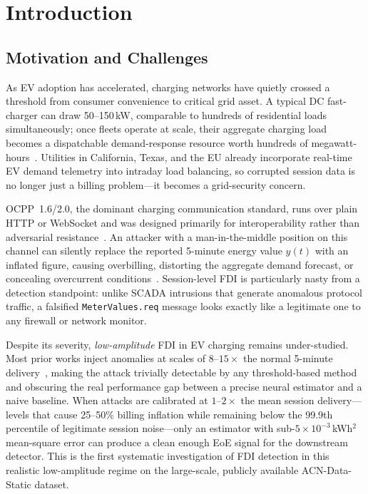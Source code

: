 \documentclass[journal]{IEEEtran}
\begin{document}

\section{Introduction}
\label{sec:intro}

\subsection{Motivation and Challenges}

As EV adoption has accelerated, charging networks have quietly
crossed a threshold from consumer convenience to critical grid
asset.
A typical DC fast-charger can draw 50--150\,kW, comparable to
hundreds of residential loads simultaneously; once fleets operate
at scale, their aggregate charging load becomes a dispatchable
demand-response resource worth hundreds of megawatt-hours~\cite{sun2020charging}.
Utilities in California, Texas, and the EU already incorporate
real-time EV demand telemetry into intraday load balancing,
so corrupted session data is no longer just a billing problem---it
becomes a grid-security concern.

OCPP~1.6/2.0, the dominant charging communication standard, runs
over plain HTTP or WebSocket and was designed primarily for
interoperability rather than adversarial resistance~\cite{sarieddine2023}.
An attacker with a man-in-the-middle position on this channel
can silently replace the reported 5-minute energy value $y(t)$
with an inflated figure, causing overbilling, distorting the
aggregate demand forecast, or concealing overcurrent
conditions~\cite{liu2011false}.
Session-level FDI is particularly nasty from a detection standpoint:
unlike SCADA intrusions that generate anomalous protocol traffic,
a falsified \texttt{MeterValues.req} message looks exactly like a
legitimate one to any firewall or network monitor.

Despite its severity, \emph{low-amplitude} FDI in EV charging
remains under-studied.
Most prior works inject anomalies at scales of $8$--$15\times$
the normal 5-minute delivery~\cite{basumatary2025,zhang2019false},
making the attack trivially detectable by any threshold-based
method and obscuring the real performance gap between a
precise neural estimator and a naive baseline.
When attacks are calibrated at $1$--$2\times$ the mean session
delivery---levels that cause 25--50\% billing inflation while
remaining below the 99.9th percentile of legitimate session
noise---only an estimator with sub-$5\times10^{-3}$\,kWh$^2$
mean-square error can produce a clean enough EoE signal for
the downstream detector.
This is the first systematic investigation of FDI detection in
this realistic low-amplitude regime on the large-scale,
publicly available ACN-Data-Static dataset.
\end{document}
